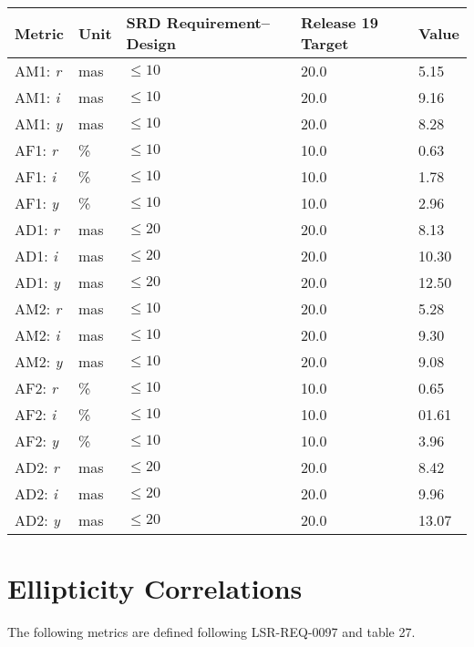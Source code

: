 \documentclass[DM,lsstdraft,toc]{lsstdoc}
\begin{document}
\begin{longtable}{L{0.19\columnwidth}L{0.08\columnwidth}L{0.2\columnwidth}R{0.22\columnwidth}R{0.17\columnwidth}}
\toprule
Metric &
Unit &
SRD Requirement--Design &
Release 19 Target &
Value
\tabularnewline
\midrule
\endhead
AM1: \emph{r} &
mas &
\(\leq 10\) &
20.0 &
5.15
\tabularnewline
AM1: \emph{i} &
mas &
\(\leq 10\) &
20.0 &
9.16
\tabularnewline
AM1: \emph{y} &
mas &
\(\leq 10\) &
20.0 &
8.28
\tabularnewline
AF1: \emph{r} &
\% &
\(\leq 10\) &
10.0 &
0.63
\tabularnewline
AF1: \emph{i} &
\% &
\(\leq 10\) &
10.0 &
1.78
\tabularnewline
AF1: \emph{y} &
\% &
\(\leq 10\) &
10.0 &
2.96
\tabularnewline
AD1: \emph{r} &
mas &
\(\leq 20\) &
20.0 &
8.13
\tabularnewline
AD1: \emph{i} &
mas &
\(\leq 20\) &
20.0 &
10.30
\tabularnewline
AD1: \emph{y} &
mas &
\(\leq 20\) &
20.0 &
12.50
\tabularnewline
AM2: \emph{r} &
mas &
\(\leq 10\) &
20.0 &
5.28
\tabularnewline
AM2: \emph{i} &
mas &
\(\leq 10\) &
20.0 &
9.30
\tabularnewline
AM2: \emph{y} &
mas &
\(\leq 10\) &
20.0 &
9.08
\tabularnewline
AF2: \emph{r} &
\% &
\(\leq 10\) &
10.0 &
0.65
\tabularnewline
AF2: \emph{i} &
\% &
\(\leq 10\) &
10.0 &
01.61
\tabularnewline
AF2: \emph{y} &
\% &
\(\leq 10\) &
10.0 &
3.96
\tabularnewline
AD2: \emph{r} &
mas &
\(\leq 20\) &
20.0 &
8.42
\tabularnewline
AD2: \emph{i} &
mas &
\(\leq 20\) &
20.0 &
9.96
\tabularnewline
AD2: \emph{y} &
mas &
\(\leq 20\) &
20.0 &
13.07
\tabularnewline
\bottomrule
\end{longtable}

\section{Ellipticity Correlations}\label{ellipticity-correlations}


The following metrics are defined following LSR-REQ-0097
 and  table 27.
\end{document}
